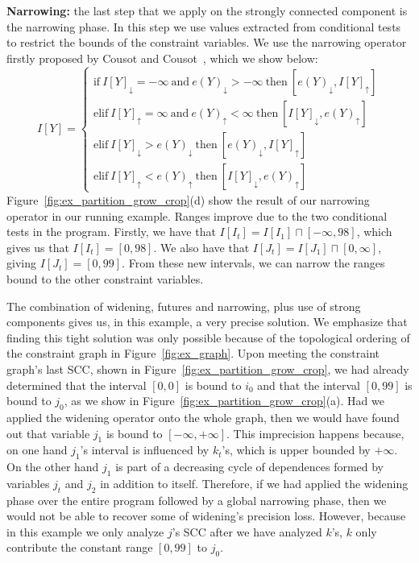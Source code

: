 \documentclass{sigplanconf}[10pt]
\newcommand{\lb}[1]{#1_{\downarrow}}
\newcommand{\ub}[1]{#1_{\uparrow}}
\begin{document}
\noindent
\textbf{Narrowing: } the last step that we apply on the strongly connected
component is the narrowing phase.
In this step we use values extracted from conditional tests to restrict the
bounds of the constraint variables.
We use the narrowing operator firstly proposed by Cousot and
Cousot~\cite{Cousot77}, which we show below:
%
\begin{equation*}
I[Y] =
\begin{cases}
\mbox{if} \ \lb{I[Y]} = -\infty  \ \mbox{and} \ \lb{e(Y)} > -\infty \ \mbox{then} \ [\lb{e(Y)}, \ub{I[Y]}] \\
\mbox{elif} \ \ub{I[Y]} = \infty \ \mbox{and} \ \ub{e(Y)} < \infty \ \mbox{then}
\ [\lb{I[Y]}, \ub{e(Y)}] \\
\mbox{elif} \ \lb{I[Y]} > \lb{e(Y)} \ \mbox{then} \ [\lb{e(Y)}, \ub{I[Y]}] \\
\mbox{elif} \ \ub{I[Y]} < \ub{e(Y)} \ \mbox{then} \ [\lb{I[Y]}, \ub{e(Y)}]
\end{cases}
\end{equation*}
%
Figure~\ref{fig:ex_partition_grow_crop}(d) show the result of our narrowing
operator in our running example.
Ranges improve due to the two conditional tests in the program.
Firstly, we have that $I[I_t] = I[I_1] \sqcap [-\infty, 98]$, which gives us
that $I[I_t] = [0, 98]$.
We also have that $I[J_t] = I[J_1] \sqcap [0, \infty]$, giving
$I[J_t] = [0, 99]$.
From these new intervals, we can narrow the ranges bound to the other constraint
variables.

The combination of widening, futures and narrowing, plus use of strong components
gives us, in this example, a very precise solution.
We emphasize that finding this tight solution was only possible because of
the topological ordering of the constraint graph in Figure~\ref{fig:ex_graph}.
Upon meeting the constraint graph's last SCC, shown in
Figure~\ref{fig:ex_partition_grow_crop}, we had already determined that the
interval $[0, 0]$ is bound to $i_0$ and that the interval $[0, 99]$ is bound to
$j_0$, as we show in Figure~\ref{fig:ex_partition_grow_crop}(a).
Had we applied the widening operator onto the whole graph, then we would
have found out that variable $j_1$ is bound to $[-\infty, +\infty]$.
This imprecision happens because, on one hand $j_1$'s interval is influenced
by $k_t$'s, which is upper bounded by $+\infty$.
On the other hand $j_1$ is part of a decreasing cycle of dependences formed by
variables $j_t$ and $j_2$ in addition to itself.
Therefore, if we had applied the widening phase over the entire program followed
by a global narrowing phase, then we would not be able to recover some of
widening's precision loss.
However, because in this example we only analyze $j$'s SCC after we have
analyzed $k$'s, $k$ only contribute the constant range $[0, 99]$ to $j_0$.
\end{document}
